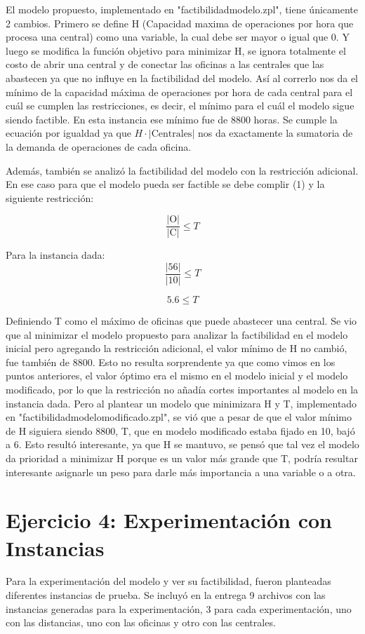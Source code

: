 \documentclass{article}
\begin{document}
El modelo propuesto, implementado en "factibilidadmodelo.zpl", tiene únicamente 2 cambios. Primero se define H (Capacidad maxima de operaciones por hora que procesa una central) como una variable, la cual debe ser mayor o igual que 0. Y luego se modifica la función objetivo para minimizar H, se ignora totalmente el costo de abrir una central y de conectar las oficinas a las centrales que las abastecen ya que no influye en la factibilidad del modelo. Así al correrlo nos da el mínimo de la capacidad máxima de operaciones por hora de cada central para el cuál se cumplen las restricciones, es decir, el mínimo para el cuál el modelo sigue siendo factible. En esta instancia ese mínimo fue de 8800 horas. Se cumple la ecuación por igualdad ya que \( H \cdot \lvert \text{Centrales} \rvert \) nos da exactamente la sumatoria de la demanda de operaciones de cada oficina.

Además, también se analizó la factibilidad del modelo con la restricción adicional. En ese caso para que el modelo pueda ser factible se debe complir (1) y la siguiente restricción:

\[
\frac{\lvert \text{O} \rvert}{\lvert \text{C} \rvert} \leq T
\]

Para la instancia dada:
\[
\frac{\lvert \text{56} \rvert}{\lvert \text{10} \rvert}  \leq T
\]

\[
5.6 \leq T
\]

Definiendo T como el máximo de oficinas que puede abastecer una central. Se vio que al minimizar el modelo propuesto para analizar la factibilidad en el modelo inicial pero agregando la restricción adicional, el valor mínimo de H no cambió, fue también de 8800. Esto no resulta sorprendente ya que como vimos en los puntos anteriores, el valor óptimo era el mismo en el modelo inicial y el modelo modificado, por lo que la restricción no añadía cortes importantes al modelo en la instancia dada. Pero al plantear un modelo que minimizara H y T, implementado en "factibilidadmodelomodificado.zpl", se vió que a pesar de que el valor mínimo de H siguiera siendo 8800, T, que en modelo modificado estaba fijado en 10, bajó a 6. Esto resultó interesante, ya que H se mantuvo, se pensó que tal vez el modelo da prioridad a minimizar H porque es un valor más grande que T, podría resultar interesante asignarle un peso para darle más importancia a una variable o a otra. 

\section*{Ejercicio 4: Experimentación con Instancias}
Para la experimentación del modelo y ver su factibilidad, fueron planteadas diferentes instancias de prueba. Se incluyó en la entrega 9 archivos con las instancias generadas para la experimentación, 3 para cada experimentación, uno con las distancias, uno con las oficinas y otro con las centrales.
\end{document}

